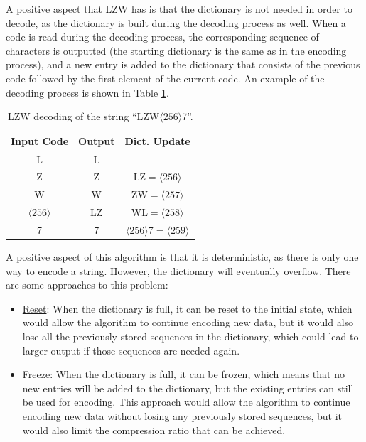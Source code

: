 A positive aspect that LZW has is that the dictionary is not needed in order to decode, as the dictionary is built during the decoding process as well. When a code is read during the decoding process, the corresponding sequence of characters is outputted (the starting dictionary is the same as in the encoding process), and a new entry is added to the dictionary that consists of the previous code followed by the first element of the current code. An example of the decoding process is shown in Table \ref{tab:lzwdec}.
\begin{table}
    \centering
    \caption{LZW decoding of the string ``LZW$\langle256\rangle$7''.}
    \renewcommand{\arraystretch}{1.2}
    \begin{tabular}{|c|c|c|}
        \hline
        \rowcolor{header}
        \textbf{\color{white}Input Code} & \textbf{\color{white}Output} & \textbf{\color{white}Dict. Update} \\ \hline
        L & L & - \\ \hline
        Z & Z & LZ$=\langle256\rangle$ \\ \hline
        W & W & ZW$=\langle257\rangle$ \\ \hline
        $\langle256\rangle$ & LZ & WL$=\langle258\rangle$ \\ \hline
        7 & 7 & $\langle256\rangle$7$=\langle259\rangle$ \\ \hline
    \end{tabular}
    \label{tab:lzwdec}
\end{table}

A positive aspect of this algorithm is that it is deterministic, as there is only one way to encode a string. However, the dictionary will eventually overflow. There are some approaches to this problem:
\begin{itemize}
    \item \ul{Reset}: When the dictionary is full, it can be reset to the initial state, which would allow the algorithm to continue encoding new data, but it would also lose all the previously stored sequences in the dictionary, which could lead to larger output if those sequences are needed again.
    \item \ul{Freeze}: When the dictionary is full, it can be frozen, which means that no new entries will be added to the dictionary, but the existing entries can still be used for encoding. This approach would allow the algorithm to continue encoding new data without losing any previously stored sequences, but it would also limit the compression ratio that can be achieved.
\end{itemize}

